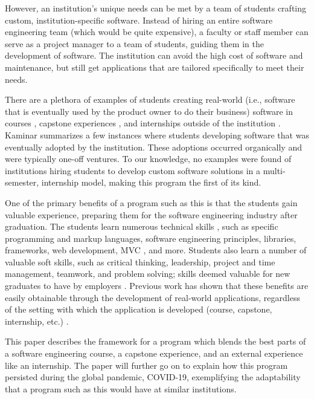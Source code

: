 However, an institution's unique needs can be met by a team of students crafting custom, institution-specific software. Instead of hiring an entire software engineering team (which would be quite expensive), a faculty or staff member can serve as a project manager to a team of students, guiding them in the development of software. The institution can avoid the high cost of software and maintenance, but still get applications that are tailored specifically to meet their needs.

There are a plethora of examples of students creating real-world (i.e., software that is eventually used by the product owner to do their business) software in courses \cite{coursevsproject, tadayon2004software}, capstone experiences \cite{keogh2007scalable, capstone}, and internships outside of the institution \cite{rochesterfirstundergradsoftwareteam}. Kaminar \cite{kaminer_2014} summarizes a few instances where students developing software that was eventually adopted by the institution. These adoptions occurred organically and were typically one-off ventures. To our knowledge, no examples were found of institutions hiring students to develop custom software solutions in a multi-semester, internship model, making this program the first of its kind.

One of the primary benefits of a program such as this is that the students gain valuable experience, preparing them for the software engineering industry after graduation. The students learn numerous technical skills \cite{hardskills}, such as specific programming and markup languages, software engineering principles, libraries, frameworks, web development, MVC \cite{mvc}, and more. Students also learn a number of valuable soft skills, such as critical thinking, leadership, project and time management, teamwork, and problem solving; skills deemed valuable for new graduates to have by employers \cite{lavy2013soft}. Previous work has shown that these benefits are easily obtainable through the development of real-world applications, regardless of the setting with which the application is developed (course, capstone, internship, etc.) \cite{heggen2018hiring, liu2005enriching, alzamil2005towards}.

This paper describes the framework for a program which blends the best parts of a software engineering course, a capstone experience, and an external experience like an internship. The paper will further go on to explain how this program persisted during the global pandemic, COVID-19, exemplifying the adaptability that a program such as this would have at similar institutions.
